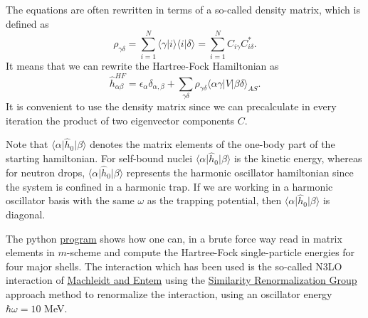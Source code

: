 \documentclass[%
oneside,                 %
final,                   %
10pt]{article}
\newenvironment{doconceexercise}{}{}
\begin{document}
\begin{doconceexercise}
The equations are often rewritten in terms of a so-called density matrix,
which is defined as 
\begin{equation}
\rho_{\gamma\delta}=\sum_{i=1}^{N}\langle\gamma|i\rangle\langle i|\delta\rangle = \sum_{i=1}^{N}C_{i\gamma}C^*_{i\delta}.
\end{equation}
It means that we can rewrite the Hartree-Fock Hamiltonian as
\[
\hat{h}_{\alpha\beta}^{HF}=\epsilon_{\alpha}\delta_{\alpha,\beta}+
\sum_{\gamma\delta} \rho_{\gamma\delta}\langle \alpha\gamma|V|\beta\delta\rangle_{AS}.
\]
It is convenient to use the density matrix since we can precalculate in every iteration the product of two eigenvector components $C$. 

Note that $\langle \alpha\vert\hat{h}_0\vert\beta \rangle$ denotes the
matrix elements of the one-body part of the starting hamiltonian. For
self-bound nuclei $\langle \alpha\vert\hat{h}_0\vert\beta \rangle$ is the
kinetic energy, whereas for neutron drops, $\langle \alpha \vert \hat{h}_0 \vert \beta \rangle$ represents the harmonic oscillator hamiltonian since
the system is confined in a harmonic trap. If we are working in a
harmonic oscillator basis with the same $\omega$ as the trapping
potential, then $\langle \alpha\vert\hat{h}_0 \vert \beta \rangle$ is
diagonal.

The python
\href{{https://github.com/CompPhysics/ManyBodyMethods/tree/master/doc/src/hfock/Code}}{program}
shows how one can, in a brute force way read in matrix elements in
$m$-scheme and compute the Hartree-Fock single-particle energies for
four major shells. The interaction which has been used is the
so-called N3LO interaction of \href{{http://journals.aps.org/prc/abstract/10.1103/PhysRevC.68.041001}}{Machleidt and
Entem}
using the \href{{http://journals.aps.org/prc/abstract/10.1103/PhysRevC.75.061001}}{Similarity Renormalization
Group}
approach method to renormalize the interaction, using an oscillator
energy $\hbar\omega=10$ MeV.


\end{doconceexercise}
\end{document}
